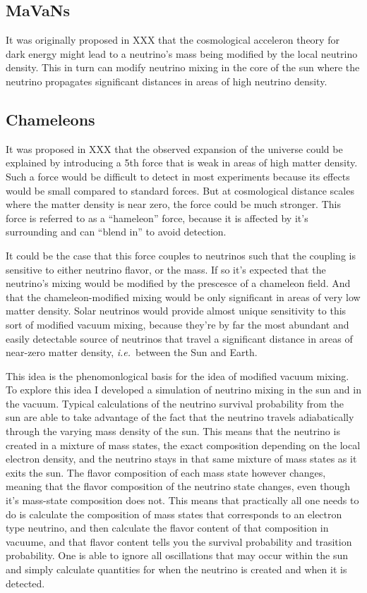 \subsection{MaVaNs}
It was originally proposed in XXX that the cosmological acceleron theory for dark
energy might lead to a neutrino's mass being modified by the local neutrino density.
This in turn can modify neutrino mixing in the core of the sun where the neutrino
propagates significant distances in areas of high neutrino density.


\subsection{Chameleons}
It was proposed in XXX that the observed expansion
of the universe could be explained by introducing a 5th force that is weak
in areas of high matter density. Such a force would be difficult to detect
in most experiments because its effects would be small compared to standard
forces. But at cosmological distance scales where the matter density is near
zero, the force could be much stronger. This force is referred to as a ``hameleon''
force, because it is affected by it's surrounding and can ``blend in'' to avoid
detection.

It could be the case that this force couples to neutrinos such that the coupling
is sensitive to either neutrino flavor, or the mass. If so it's expected that the
neutrino's mixing would be modified by the prescesce of a chameleon field.
And that the chameleon-modified mixing would be only significant in areas of very
low matter density.
Solar neutrinos would provide almost unique sensitivity to this sort of modified
vacuum mixing, because they're by far the most abundant and easily detectable source
of neutrinos that travel a significant distance in areas of near-zero matter
density, \textit{ i.e.}\ between the Sun and Earth.

This idea is the phenomonlogical basis for the idea of modified vacuum mixing.
To explore this idea I developed a simulation of neutrino mixing in the sun and in
the vacuum. Typical calculations of the neutrino survival probability from
the sun are able to take advantage of the fact that the neutrino travels adiabatically
through the varying mass density of the sun. This means that the neutrino is
created in a mixture of mass states, the exact composition depending on the local
electron density, and the neutrino stays in that same mixture of mass states
as it exits the sun. The flavor composition of each mass state however changes,
meaning that the flavor composition of the neutrino state changes, even though
it's mass-state composition does not.
This means that practically all one needs to do is calculate the composition
of mass states that corresponds to an electron type neutrino, and then calculate
the flavor content of that composition in vacuume, and that flavor content
tells you the survival probability and trasition probability. One is able to
ignore all oscillations that may occur within the sun and simply calculate
quantities for when the neutrino is created and when it is detected.

